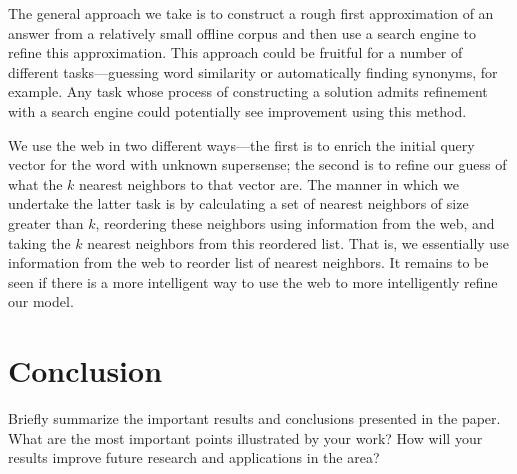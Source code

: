 \documentclass{article}
\begin{document}
The general approach we take is to construct a rough first approximation of an answer from a relatively small offline corpus and then use a search engine to refine this approximation.
This approach could be fruitful for a number of different tasks---guessing word similarity or automatically finding synonyms, for example.
Any task whose process of constructing a solution admits refinement with a search engine  could potentially see improvement using this method.

We use the web in two different ways---the first is to enrich the initial query vector for the word with unknown supersense; the second is to refine our guess of what the $k$ nearest neighbors to that vector are.
The manner in which we undertake the latter task is by calculating a set of nearest neighbors of size greater than $k$, reordering these neighbors using information from the web, and taking the $k$ nearest neighbors from this reordered list.
That is, we essentially use information from the web to reorder list of nearest neighbors.
It remains to be seen if there is a more intelligent way to use the web to more intelligently refine our model.

\section{Conclusion}

Briefly summarize the important results and conclusions presented in the paper. What are the most important points illustrated by your work? How will your results improve future research and applications in the area? 




{}

\end{document}

